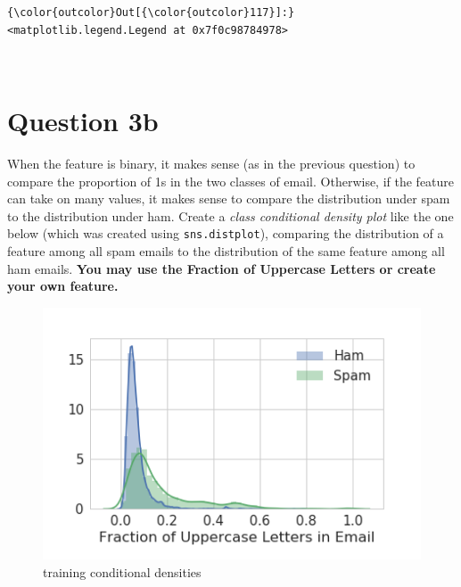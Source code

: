 \documentclass[11pt]{article}
\makeatletter
\def\maxwidth{\ifdim\Gin@nat@width>\linewidth\linewidth
    \else\Gin@nat@width\fi}
\let\Oldincludegraphics\includegraphics
\renewcommand{\includegraphics}[1]{\Oldincludegraphics[width=.8\maxwidth]{#1}}
\makeatother
\begin{document}
\begin{Verbatim}[commandchars=\\\{\}]
{\color{outcolor}Out[{\color{outcolor}117}]:} <matplotlib.legend.Legend at 0x7f0c98784978>
\end{Verbatim}
            
    \begin{center}
    \end{center}
    { \hspace*{\fill} \\}
    
    \section{Question 3b}\label{question-3b}

When the feature is binary, it makes sense (as in the previous question)
to compare the proportion of 1s in the two classes of email. Otherwise,
if the feature can take on many values, it makes sense to compare the
distribution under spam to the distribution under ham. Create a
\emph{class conditional density plot} like the one below (which was
created using \texttt{sns.distplot}), comparing the distribution of a
feature among all spam emails to the distribution of the same feature
among all ham emails. \textbf{You may use the Fraction of Uppercase
Letters or create your own feature.}

\begin{figure}
\centering
\includegraphics{training_conditional_densities2.png}
\caption{training conditional densities}
\end{figure}
\end{document}

